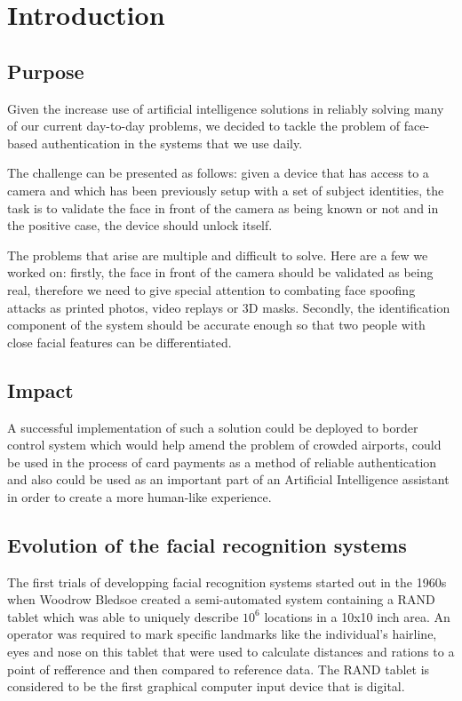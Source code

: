 \chapter{Introduction}

\section{Purpose}

Given the increase use of artificial intelligence solutions in reliably solving many of our current day-to-day problems, we decided to tackle the problem of face-based authentication in the systems that we use daily.

The challenge can be presented as follows: given a device that has access to a camera and which has been previously setup with a set of subject identities, the task is to validate the face in front of the camera as being known or not and in the positive case, the device should unlock itself.

The problems that arise are multiple and difficult to solve. Here are a few we worked on: firstly, the face in front of the camera should be validated as being real, therefore we need to give special attention to combating face spoofing attacks as printed photos, video replays or 3D masks. Secondly, the identification component of the system should be accurate enough so that two people with close facial features can be differentiated.

\section{Impact}
A successful implementation of such a solution could be deployed to border control system which would help amend the problem of crowded airports, could be used in the process of card payments as a method of reliable authentication and also could be used as an important part of an Artificial Intelligence assistant in order to create a more human-like experience.

\section{Evolution of the facial recognition systems}
The first trials of developping facial recognition systems started out in the 1960s when Woodrow Bledsoe created a semi-automated system \cite{DavisMRETO64} containing a RAND tablet which was able to uniquely describe $10^{6}$ locations in a 10x10 inch area.
An operator was required to mark specific landmarks like the individual's  hairline, eyes and nose on this tablet that were used to calculate distances and rations to a point of refference and then compared to reference data. The RAND tablet is considered to be the first graphical computer input device that is digital.

